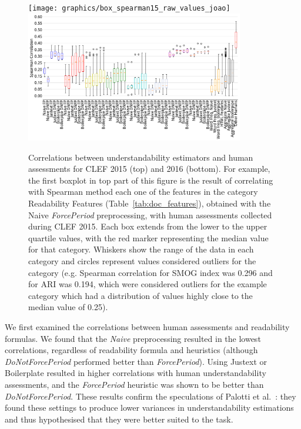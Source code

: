 \begin{figure}[h!]
   \centering
   \texttt{[image: graphics/box\_spearman15\_raw\_values\_joao]}\vspace{-7pt}
      \includegraphics[width=0.85\textwidth]{graphics/box_spearman16_raw_values}
    \caption{Correlations between understandability estimators and human assessments for CLEF 2015 (top) and 2016 (bottom). For example, the first boxplot in top part of this figure is the result of correlating with Spearman method each one of the features in the category Readability Features (Table~\ref{tab:doc_features}), obtained with the Naive \textit{ForcePeriod} preprocessing, with human assessments collected during CLEF 2015. Each box extends from the lower to the upper quartile values, with the red marker representing the median value for that category. Whiskers show the range of the data in each category and circles represent values considered outliers for the category (e.g. Spearman correlation for SMOG index was 0.296 and for ARI was 0.194, which were considered outliers for the example category which had a distribution of values highly close to the median value of 0.25).}
   \label{fig:boxplot_corr_docs}
   \vspace{-10pt}
\end{figure}

We first examined the correlations between human assessments and readability formulas. We found that the \textit{Naive} preprocessing resulted in the lowest correlations, regardless of readability formula and heuristics (although \textit{DoNotForcePeriod} performed better than \textit{ForcePeriod}). Using Justext or Boilerplate resulted in higher correlations with human understandability assessments, and the \textit{ForcePeriod} heuristic was shown to be better than \textit{DoNotForcePeriod}. These results confirm the speculations of Palotti et al.~\cite{palotti15}: they found these settings to produce lower variances in understandability estimations and thus hypothesised that they were better suited to the task.


